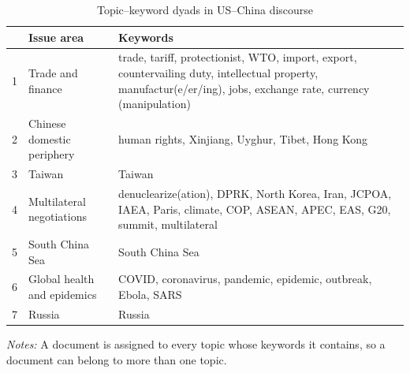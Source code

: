 \begin{table}[htbp]
\centering
\begin{threeparttable}
\caption{Topic--keyword dyads in US--China discourse}
\label{tab:topic-keywords}
\small
\begin{tabular}{@{}l l p{3.4in}@{}}
\toprule
 & Issue area & Keywords \\
\midrule
1 & Trade and finance & trade, tariff, protectionist, WTO, import, export, countervailing duty, intellectual property, manufactur(e/er/ing), jobs, exchange rate, currency (manipulation) \\
2 & Chinese domestic periphery & human rights, Xinjiang, Uyghur, Tibet, Hong Kong \\
3 & Taiwan & Taiwan \\
4 & Multilateral negotiations & denuclearize(ation), DPRK, North Korea, Iran, JCPOA, IAEA, Paris, climate, COP, ASEAN, APEC, EAS, G20, summit, multilateral \\
5 & South China Sea & South China Sea \\
6 & Global health and epidemics & COVID, coronavirus, pandemic, epidemic, outbreak, Ebola, SARS \\
7 & Russia & Russia \\
\bottomrule
\end{tabular}
\begin{tablenotes}[flushleft]
\footnotesize
\item \textit{Notes:} A document is assigned to every topic whose keywords it contains, so a document can belong to more than one topic.
\end{tablenotes}
\end{threeparttable}
\end{table}
